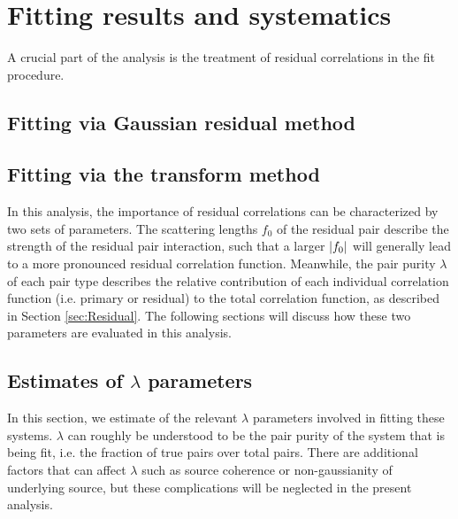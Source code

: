 \section{Fitting results and systematics}
\label{sec:FittingSystematics}

A crucial part of the analysis is the treatment of residual correlations in the fit procedure.


\subsection{Fitting via Gaussian residual method}



\subsection{Fitting via the transform method}

In this analysis, the importance of residual correlations can be characterized by two sets of parameters.  
The scattering lengths $f_0$ of the residual pair describe the strength of the residual pair interaction, such that a larger $\left\lvert f_0\right\rvert$ will generally lead to a more pronounced residual correlation function.  
Meanwhile, the pair purity $\lambda$ of each pair type describes the relative contribution of each individual correlation function (i.e. primary or residual) to the total correlation function, as described in Section \ref{sec:Residual}. 
The following sections will discuss how these two parameters are evaluated in this analysis.



\subsection{Estimates of \texorpdfstring{$\lambda$}{lambda} parameters}
\label{sec:LambdaParams}

In this section, we estimate of the relevant $\lambda$ parameters involved in fitting these systems.  
$\lambda$ can roughly be understood to be the pair purity of the system that is being fit, i.e. the fraction of true pairs over total pairs.  
There are additional factors that can affect $\lambda$ such as source coherence or non-gaussianity of underlying source, but these complications will be neglected in the present analysis.

